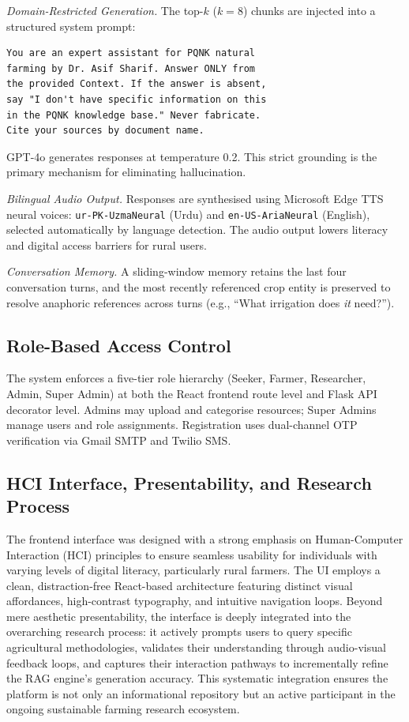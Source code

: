 \documentclass[conference]{IEEEtran}
\begin{document}
\textit{Domain-Restricted Generation.}
The top-$k$ ($k = 8$) chunks are injected into a structured system prompt:

\begin{lstlisting}[caption={Domain-restriction system prompt (abbreviated).}]
You are an expert assistant for PQNK natural
farming by Dr. Asif Sharif. Answer ONLY from
the provided Context. If the answer is absent,
say "I don't have specific information on this
in the PQNK knowledge base." Never fabricate.
Cite your sources by document name.
\end{lstlisting}

GPT-4o generates responses at temperature 0.2. This strict grounding is the primary
mechanism for eliminating hallucination.

\textit{Bilingual Audio Output.}
Responses are synthesised using Microsoft Edge TTS neural voices: \texttt{ur-PK-UzmaNeural}
(Urdu) and \texttt{en-US-AriaNeural} (English), selected automatically by language
detection. The audio output lowers literacy and digital access barriers for rural users.

\textit{Conversation Memory.}
A sliding-window memory retains the last four conversation turns, and the most recently
referenced crop entity is preserved to resolve anaphoric references across turns
(e.g., ``What irrigation does \textit{it} need?'').

\subsection{Role-Based Access Control}

The system enforces a five-tier role hierarchy (Seeker, Farmer, Researcher, Admin,
Super Admin) at both the React frontend route level and Flask API decorator level.
Admins may upload and categorise resources; Super Admins manage users and role assignments.
Registration uses dual-channel OTP verification via Gmail SMTP and Twilio SMS.

\subsection{HCI Interface, Presentability, and Research Process}
The frontend interface was designed with a strong emphasis on Human-Computer Interaction (HCI) principles to ensure seamless usability for individuals with varying levels of digital literacy, particularly rural farmers. The UI employs a clean, distraction-free React-based architecture featuring distinct visual affordances, high-contrast typography, and intuitive navigation loops. Beyond mere aesthetic presentability, the interface is deeply integrated into the overarching research process: it actively prompts users to query specific agricultural methodologies, validates their understanding through audio-visual feedback loops, and captures their interaction pathways to incrementally refine the RAG engine's generation accuracy. This systematic integration ensures the platform is not only an informational repository but an active participant in the ongoing sustainable farming research ecosystem.
\end{document}
